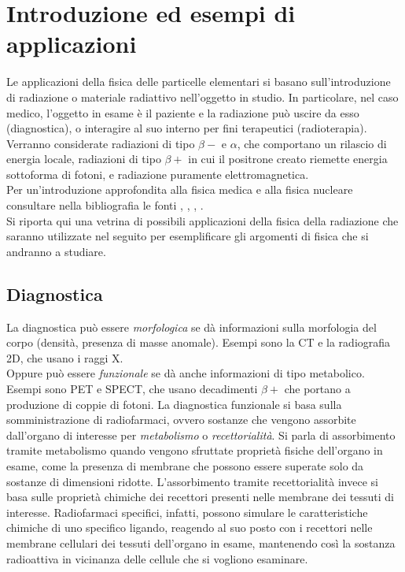 \chapter{Introduzione ed esempi di applicazioni}

Le applicazioni della fisica delle particelle elementari si basano sull'introduzione di radiazione o materiale radiattivo nell'oggetto in studio. In particolare, nel caso medico, l'oggetto in esame è il paziente e la radiazione può uscire da esso (diagnostica), o interagire al suo interno per fini terapeutici (radioterapia).
Verranno considerate radiazioni di tipo $\beta-$ e $\alpha$, che comportano un rilascio di energia locale, radiazioni di tipo $\beta+$ in cui il positrone creato riemette energia sottoforma di fotoni, e radiazione puramente elettromagnetica.\\
Per un'introduzione approfondita alla fisica medica e alla fisica nucleare consultare nella bibliografia le fonti \cite{ENMP} \cite{NMP}, \cite{CLA}, \cite{Corvisiero3}, \cite{Nutshell}.\\

Si riporta qui una vetrina di possibili applicazioni della fisica della radiazione che saranno utilizzate nel seguito per esemplificare gli argomenti di fisica che si andranno a studiare.

\section{Diagnostica}

La diagnostica può essere \emph{morfologica} se dà informazioni sulla morfologia del corpo (densità, presenza di masse anomale). Esempi sono la CT e la radiografia 2D, che usano i raggi X.\\
Oppure può essere \emph{funzionale} se dà anche informazioni di tipo metabolico. Esempi sono PET e SPECT, che usano decadimenti $\beta+$ che portano a produzione di coppie di fotoni.
La diagnostica funzionale si basa sulla somministrazione di radiofarmaci, ovvero sostanze che vengono assorbite dall'organo di interesse per \emph{metabolismo} o \emph{recettorialità}. Si parla di assorbimento tramite metabolismo quando vengono sfruttate proprietà fisiche dell'organo in esame, come la presenza di membrane che possono essere superate solo da sostanze di dimensioni ridotte. L'assorbimento tramite recettorialità invece si basa sulle proprietà chimiche dei recettori presenti nelle membrane dei tessuti di interesse. Radiofarmaci specifici, infatti, possono simulare le caratteristiche chimiche di uno specifico ligando, reagendo al suo posto con i recettori nelle membrane cellulari dei tessuti dell'organo in esame, mantenendo così la sostanza radioattiva in vicinanza delle cellule che si vogliono esaminare.

